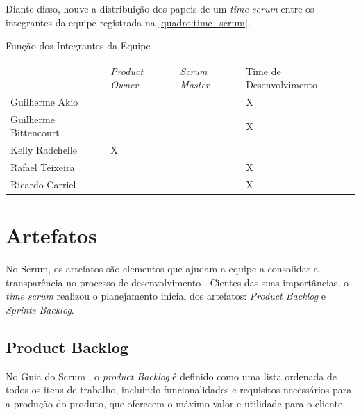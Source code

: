 \documentclass[
	12pt,				%
	openany,			%
	oneside,			%
	a4paper,			%
	english,			%
	french,				%
	spanish,			%
	brazil				%
	]{abntex2}
\begin{document}
Diante disso, houve a distribuição dos papeis de um \textit{time scrum} entre os integrantes da equipe registrada na \autoref{quadro:time_scrum}.
%
\begin{quadro}[H]
	\centering
	\caption{Função dos Integrantes da Equipe}
	\label{quadro:time_scrum}
	\begin{tabular}{|>{\centering\arraybackslash}m{3.2cm}|>{\centering\arraybackslash}m{3.5cm}|>{\centering\arraybackslash}m{3.5cm}|>{\centering\arraybackslash}m{4cm}|}
		\hline
		\multirow{2}{*}{\textbf{Integrante}} & \multicolumn{3}{c|}{\textbf{Função}} \\ \cline{2-4}
		&\textit{Product Owner} & \textit{Scrum Master} & Time de Desenvolvimento \\ \hline 
		 Guilherme Akio & & & X \\ \hline Guilherme Bittencourt & & & X \\ \hline Kelly Radchelle & X & & \\ \hline Rafael Teixeira & & & X \\ \hline Ricardo Carriel & & & X \\ \hline
	\end{tabular}
\end{quadro}

\section{Artefatos}
No Scrum,  os artefatos são elementos que ajudam a equipe a consolidar a transparência no processo de desenvolvimento  \cite{scrumguide}. Cientes das suas importâncias, o \textit {time scrum} realizou o planejamento inicial dos artefatos:  \textit {Product Backlog} e \textit {Sprints Backlog}.
%
\subsection{Product Backlog}
No Guia do Scrum \cite{scrumguide}, o \textit{product Backlog} é definido como uma lista ordenada de todos os itens de trabalho, incluindo funcionalidades e requisitos necessários para a produção do produto, que oferecem o máximo valor e utilidade para o cliente.
\end{document}
